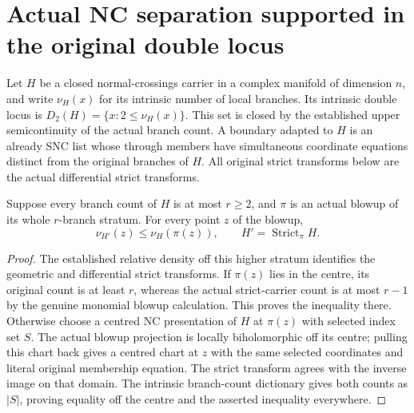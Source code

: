\section{Actual NC separation supported in the original double locus}
\label{sec:hironaka-normal-crossings-double-locus-separation}

Let $H$ be a closed normal-crossings carrier in a complex manifold of
dimension $n$, and write $\nu_H(x)$ for its intrinsic number of local
branches. Its intrinsic double locus is
$D_2(H)=\{x:2\leq\nu_H(x)\}$. This set is closed by the established
upper semicontinuity of the actual branch count. A boundary adapted to
$H$ is an already SNC list whose through members have simultaneous
coordinate equations distinct from the original branches of $H$.
All original strict transforms below are the actual differential
strict transforms.

\begin{lemma}
\label{hir:general-nc-higher-count-over-image}
\leanok
{}
Suppose every branch count of $H$ is at most $r\geq2$, and $\pi$ is
an actual blowup of its whole $r$-branch stratum. For every point $z$
of the blowup,
\[
 \nu_{H'}(z)\leq\nu_H(\pi(z)),\qquad H'=\operatorname{Strict}_{\pi}H.
\]
\end{lemma}
\begin{proof}
The established relative density off this higher stratum identifies
the geometric and differential strict transforms. If $\pi(z)$ lies
in the centre, its original count is at least $r$, whereas the actual
strict-carrier count is at most $r-1$ by the genuine monomial blowup
calculation. This proves the inequality there. Otherwise choose a
centred NC presentation of $H$ at $\pi(z)$ with selected index set $S$.
The actual blowup projection is locally biholomorphic off its centre;
pulling this chart back gives a centred chart at $z$ with the same
selected coordinates and literal original membership equation. The
strict transform agrees with the inverse image on that domain.
The intrinsic branch-count dictionary gives both counts as $|S|$,
proving equality off the centre and the asserted inequality everywhere.
\end{proof}

